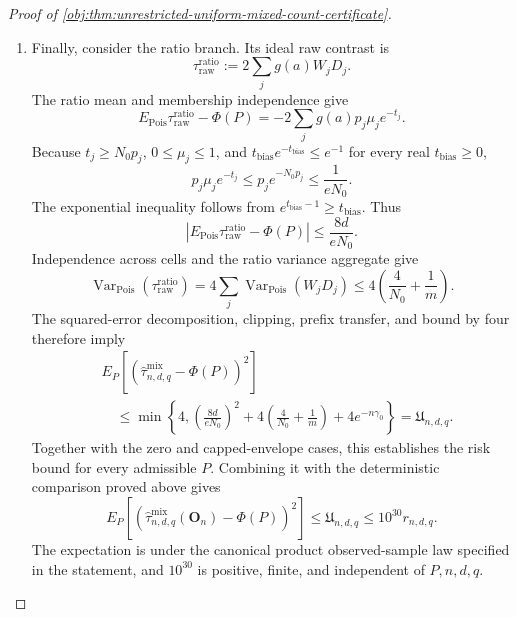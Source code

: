 \begin{proof}[Proof of \cref{obj:thm:unrestricted-uniform-mixed-count-certificate}]
\begin{enumerate}
\item Finally, consider the ratio branch. Its ideal raw contrast is
\[
\tau_{\mathrm{raw}}^{\mathrm{ratio}}
:=2\sum_jg(a)W_jD_j.
\]
The ratio mean and membership independence give
\[
E_{\mathrm{Pois}}\tau_{\mathrm{raw}}^{\mathrm{ratio}}-\Phi(P)
=-2\sum_jg(a)p_j\mu_je^{-t_j}.
\]
Because \(t_j\ge N_0p_j\), \(0\le\mu_j\le1\), and
\(t_{\mathrm{bias}}e^{-t_{\mathrm{bias}}}\le e^{-1}\) for every real
\(t_{\mathrm{bias}}\ge0\),
\[
p_j\mu_je^{-t_j}
\le p_je^{-N_0p_j}
\le\frac1{eN_0}.
\]
The exponential inequality follows from
\(e^{t_{\mathrm{bias}}-1}\ge t_{\mathrm{bias}}\).
Thus
\[
|E_{\mathrm{Pois}}\tau_{\mathrm{raw}}^{\mathrm{ratio}}-\Phi(P)|
\le\frac{8d}{eN_0}.
\]
Independence across cells and the ratio variance aggregate give
\[
\operatorname{Var}_{\mathrm{Pois}}
(\tau_{\mathrm{raw}}^{\mathrm{ratio}})
=
4\sum_j\operatorname{Var}_{\mathrm{Pois}}(W_jD_j)
\le4\left(\frac4{N_0}+\frac1m\right).
\]
The squared-error decomposition, clipping, prefix transfer, and bound by
four therefore imply
\[
\begin{aligned}
&E_P\!\left[
(\widehat\tau^{\mathrm{mix}}_{n,d,q}-\Phi(P))^2
\right]\\
&\quad\le
\min\left\{4,
\left(\frac{8d}{eN_0}\right)^2
+4\left(\frac4{N_0}+\frac1m\right)
+4e^{-n\gamma_0}\right\}
=\mathfrak U_{n,d,q}.
\end{aligned}
\]
Together with the zero and capped-envelope cases, this establishes the
risk bound for every admissible \(P\). Combining it with the deterministic
comparison proved above gives
\[
E_P\!\left[
\left(\widehat\tau^{\mathrm{mix}}_{n,d,q}(\mathbf O_n)-\Phi(P)\right)^2
\right]
\le\mathfrak U_{n,d,q}
\le10^{30}r_{n,d,q}.
\]
The expectation is under the canonical product observed-sample law
specified in the statement, and \(10^{30}\) is positive, finite, and
independent of \(P,n,d,q\).
\end{enumerate}
\end{proof}

